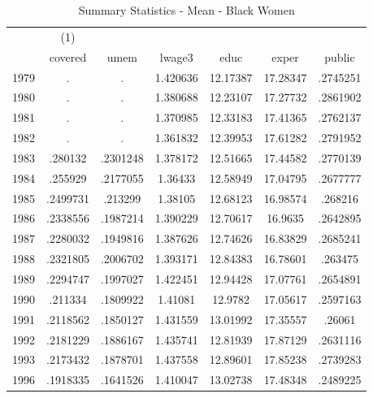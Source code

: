 {
\def\sym#1{\ifmmode^{#1}\else\(^{#1}\)\fi}
\begin{longtable}{l*{1}{cccccc}}
\caption{Summary Statistics - Mean - Black Women}\\
\hline\hline\endfirsthead\hline\endhead\hline\endfoot\endlastfoot
            &\multicolumn{1}{c}{(1)}&            &            &            &            &            \\
            &     covered&        umem&      lwage3&        educ&       exper&      public\\
\hline
1979        &           .&           .&    1.420636&    12.17387&    17.28347&    .2745251\\
1980        &           .&           .&    1.380688&    12.23107&    17.27732&    .2861902\\
1981        &           .&           .&    1.370985&    12.33183&    17.41365&    .2762137\\
1982        &           .&           .&    1.361832&    12.39953&    17.61282&    .2791952\\
1983        &     .280132&    .2301248&    1.378172&    12.51665&    17.44582&    .2770139\\
1984        &     .255929&    .2177055&     1.36433&    12.58949&    17.04795&    .2677777\\
1985        &    .2499731&     .213299&     1.38105&    12.68123&    16.98574&     .268216\\
1986        &    .2338556&    .1987214&    1.390229&    12.70617&     16.9635&    .2642895\\
1987        &    .2280032&    .1949816&    1.387626&    12.74626&    16.83829&    .2685241\\
1988        &    .2321805&    .2006702&    1.393171&    12.84383&    16.78601&     .263475\\
1989        &    .2294747&    .1997027&    1.422451&    12.94428&    17.07761&    .2654891\\
1990        &     .211334&    .1809922&     1.41081&     12.9782&    17.05617&    .2597163\\
1991        &    .2118562&    .1850127&    1.431559&    13.01992&    17.35557&      .26061\\
1992        &    .2181229&    .1886167&    1.435741&    12.81939&    17.87129&    .2631116\\
1993        &    .2173432&    .1878701&    1.437558&    12.89601&    17.85238&    .2739283\\
1996        &    .1918335&    .1641526&    1.410047&    13.02738&    17.48348&    .2489225\\

\end{longtable}}
